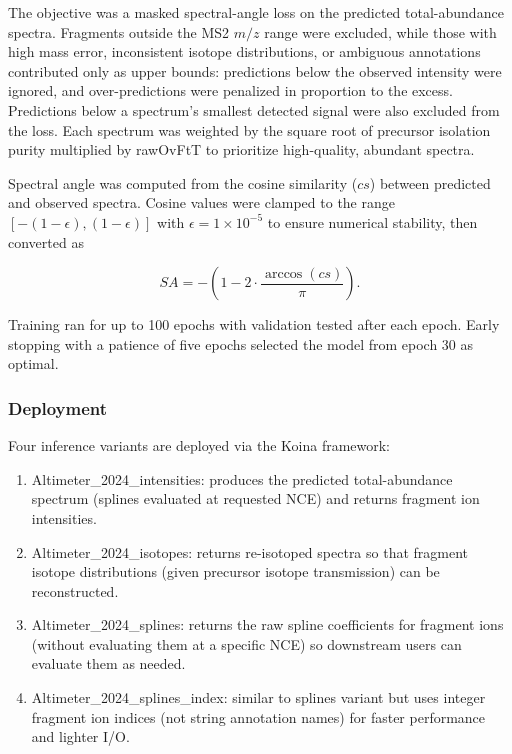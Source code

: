 \documentclass[pdflatex,sn-nature]{sn-jnl}
\begin{document}
The objective was a masked spectral-angle loss on the predicted total-abundance spectra. Fragments outside the MS2 $m/z$ range were excluded, while those with high mass error, inconsistent isotope distributions, or ambiguous annotations contributed only as upper bounds: predictions below the observed intensity were ignored, and over-predictions were penalized in proportion to the excess. Predictions below a spectrum's smallest detected signal were also excluded from the loss. Each spectrum was weighted by the square root of precursor isolation purity multiplied by rawOvFtT to prioritize high-quality, abundant spectra.  

Spectral angle was computed from the cosine similarity ($cs$) between predicted and observed spectra. Cosine values were clamped to the range $[-(1-\epsilon), (1-\epsilon)]$ with $\epsilon = 1\times10^{-5}$ to ensure numerical stability, then converted as  

\[
SA = -\left(1 - 2 \cdot \frac{\arccos(cs)}{\pi}\right).
\]  

Training ran for up to 100 epochs with validation tested after each epoch. Early stopping with a patience of five epochs selected the model from epoch 30 as optimal.  

\subsubsection{Deployment}
Four inference variants are deployed via the Koina framework:
\begin{adjustwidth}{2em}{0pt}
    \begin{enumerate}
        \item Altimeter\_2024\_intensities: produces the predicted total-abundance spectrum (splines evaluated at requested NCE) and returns fragment ion intensities.
        \item Altimeter\_2024\_isotopes: returns re-isotoped spectra so that fragment isotope distributions (given precursor isotope transmission) can be reconstructed.
        \item Altimeter\_2024\_splines: returns the raw spline coefficients for fragment ions (without evaluating them at a specific NCE) so downstream users can evaluate them as needed.
        \item Altimeter\_2024\_splines\_index: similar to splines variant but uses integer fragment ion indices (not string annotation names) for faster performance and lighter I/O.
    \end{enumerate}
\end{adjustwidth}
\end{document}
